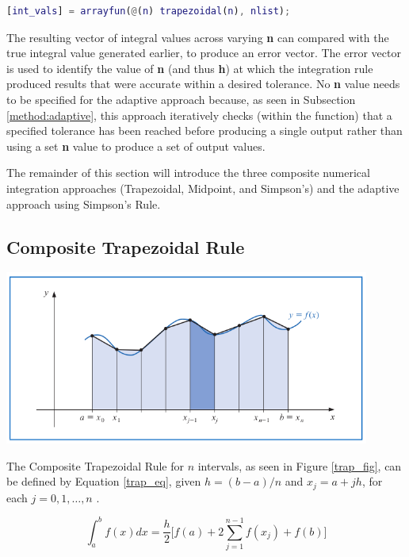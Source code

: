 \documentclass{article}
\begin{document}
\bigskip
\begin{lstlisting}[language=Matlab]
[int_vals] = arrayfun(@(n) trapezoidal(n), nlist);
\end{lstlisting}
\bigskip

The resulting vector of integral values across varying \textbf{n} can compared with the true integral value generated earlier, to produce an error vector. The error vector is used to identify the value of \textbf{n} (and thus \textbf{h}) at which the integration rule produced results that were accurate within a desired tolerance. No \textbf{n} value needs to be specified for the adaptive approach because, as seen in Subsection \ref{method:adaptive}, this approach iteratively checks (within the function) that a specified tolerance has been reached before producing a single output rather than using a set \textbf{n} value to produce a set of output values.

The remainder of this section will introduce the three composite numerical integration approaches (Trapezoidal, Midpoint, and Simpson's) and the adaptive approach using Simpson's Rule.


\subsection{Composite Trapezoidal Rule}\label{method:trapezoidal}

\begin{center}
	\includegraphics[width=0.9\textwidth]{../additional/trapezoidal_fig.png}
	\label{trap_fig}
\end{center}


The Composite Trapezoidal Rule for $n$ intervals, as seen in Figure \ref{trap_fig}, can be defined by Equation \ref{trap_eq}, given $h=(b-a)/n$ and $x_j=a+jh$, for each $j=0,1,\dots,n$ \citep{burden2010}.

\begin{equation}
\int_{a}^b f(x) dx = \frac{h}{2} \Bigg[ f(a) + 2 \sum_{j=1}^{n-1} f(x_j) + f(b) \Bigg]
\label{trap_eq}
\end{equation}
\end{document}
